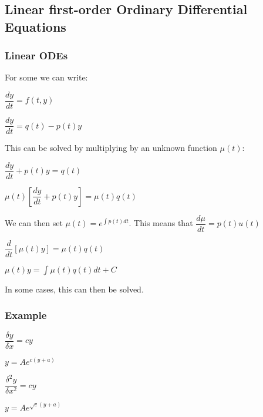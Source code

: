 
\subsection{Linear first-order Ordinary Differential Equations}

\subsubsection{Linear ODEs}

For some we can write:

\(\dfrac{dy}{dt}=f(t,y)\)

\(\dfrac{dy}{dt}=q(t)-p(t)y\)

This can be solved by multiplying by an unknown function \(\mu (t)\):

\(\dfrac{dy}{dt}+p(t)y=q(t)\)

\(\mu (t)[\dfrac{dy}{dt}+p(t)y]=\mu (t)q(t)\)

We can then set \(\mu(t)=e^{\int p(t)dt}\). This means that \(\dfrac{d\mu }{dt}=p(t)u(t)\)

\(\dfrac{d}{dt}[\mu(t)y]=\mu (t)q(t)\)

\(\mu(t)y=\int \mu (t)q(t)dt + C\)

In some cases, this can then be solved.

\subsubsection{Example}

\(\dfrac{\delta y}{\delta x}=cy\)

\(y=Ae^{c(y+a)}\)


\(\dfrac{\delta^2 y}{\delta x^2}=cy\)

\(y=Ae^{\sqrt c (y+a)}\)

